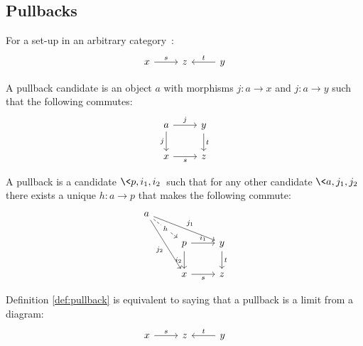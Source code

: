 \subsection{Pullbacks}

\begin{definition}
  For a set-up in an arbitrary
  category~\parencite[p.~114]{leinster:basic_category_theory}:
  \[\begin{tikzcd}[ampersand replacement=\&]
    x \& z \& y
    \arrow["t"', from=1-3, to=1-2]
    \arrow["s", from=1-1, to=1-2]
  \end{tikzcd}\]

  A pullback candidate is an object $a$ with morphisms $j:a\to x$ and
  $j:a\to y$ such that the following commutes:
  \[\begin{tikzcd}[ampersand replacement=\&]
    a \& y \\
    x \& z
    \arrow["t", from=1-2, to=2-2]
    \arrow["s"', from=2-1, to=2-2]
    \arrow["j"', from=1-1, to=2-1]
    \arrow["j", from=1-1, to=1-2]
  \end{tikzcd}\]

  A pullback is a candidate $\<p, i_1, i_2\>$ such that for any other candidate
  $\<a, j_1, j_2\>$ there exists a unique $h:a\to p$ that makes the following
  commute:
  \[\begin{tikzcd}[ampersand replacement=\&]
    a \\
    \& p \& y \\
    \& x \& z
    \arrow["{i_2}"', from=2-2, to=3-2]
    \arrow["{i_1}", from=2-2, to=2-3]
    \arrow["t", from=2-3, to=3-3]
    \arrow["s"', from=3-2, to=3-3]
    \arrow["{j_2}"', from=1-1, to=3-2]
    \arrow["{j_1}", from=1-1, to=2-3]
    \arrow["h"{description}, dashed, from=1-1, to=2-2]
  \end{tikzcd}\]
\end{definition}

\begin{definition}
  Definition \ref{def:pullback} is equivalent to saying that a pullback is a
  limit from a diagram:
  \[\begin{tikzcd}[ampersand replacement=\&]
    x \& z \& y
    \arrow["t"', from=1-3, to=1-2]
    \arrow["s", from=1-1, to=1-2]
  \end{tikzcd}\]
\end{definition}